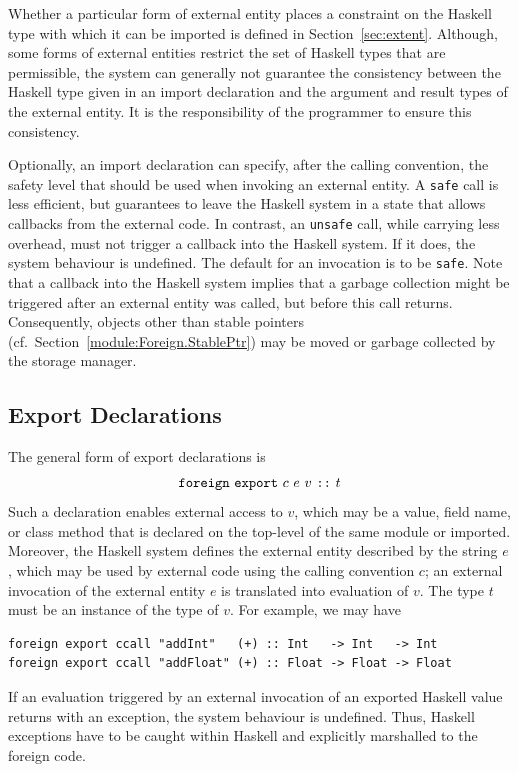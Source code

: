 Whether a particular form of external entity places a constraint on the
Haskell type with which it can be imported is defined in
Section~\ref{sec:extent}.  Although, some forms of external entities restrict
the set of Haskell types that are permissible, the system can generally not
guarantee the consistency between the Haskell type given in an import
declaration and the argument and result types of the external entity.  It is
the responsibility of the programmer to ensure this consistency.

Optionally, an import declaration can specify, after the calling convention,
the safety level that should be used when invoking an external entity.  A
\mbox{\tt safe} call is less efficient, but guarantees to leave the Haskell system
in a state that allows callbacks from the external code.  In contrast, an
\mbox{\tt unsafe} call, while carrying less overhead, must not trigger a callback
into the Haskell system.  If it does, the system behaviour is undefined.  The
default for an invocation is to be \mbox{\tt safe}.  Note that a callback into
the Haskell system implies that a garbage collection might be triggered after
an external entity was called, but before this call returns.  Consequently,
objects other than stable pointers (cf.\ Section~\ref{module:Foreign.StablePtr}) may be
moved or garbage collected by the storage manager.

\subsection{Export Declarations}

The general form of export declarations is
%
\[
\mbox{\tt foreign}~\mbox{\tt export}~c~e~v~\mbox{\tt ::}~t
\]
%
Such a declaration enables external access to $v$, which may be a value, field
name, or class method that is declared on the top-level of the same module or
imported.  Moreover, the Haskell system defines the external entity described
by the string $e$, which may be used by external code using the calling
convention $c$; an external invocation of the external entity $e$ is
translated into evaluation of $v$.  The type $t$ must be an instance of the
type of $v$.  For example, we may have
\bprog
{\small\begin{verbatim}
foreign export ccall "addInt"   (+) :: Int   -> Int   -> Int
foreign export ccall "addFloat" (+) :: Float -> Float -> Float
\end{verbatim}}
\eprog
If an evaluation triggered by an external invocation of an exported Haskell
value returns with an exception, the system behaviour is undefined.  Thus,
Haskell exceptions have to be caught within Haskell and explicitly marshalled
to the foreign code.


